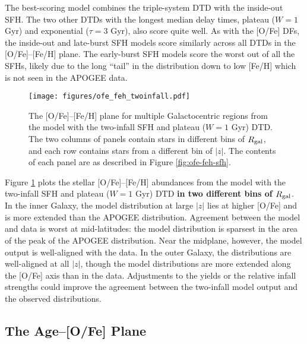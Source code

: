 \documentclass[twocolumn,twocolappendix,linenumbers]{aastex631}
\begin{document}
The best-scoring model combines the triple-system DTD with the inside-out SFH. The two other DTDs with the longest median delay times, plateau ($W=1$ Gyr) and exponential ($\tau=3$ Gyr), also score quite well. As with the [O/Fe] DFs, the inside-out and late-burst SFH models score similarly across all DTDs in the [O/Fe]--[Fe/H] plane. The early-burst SFH models score the worst out of all the SFHs, likely due to the long ``tail'' in the distribution down to low [Fe/H] which is not seen in the APOGEE data.

\begin{figure}
    \centering
    \texttt{[image: figures/ofe\_feh\_twoinfall.pdf]}
    \caption{The [O/Fe]--[Fe/H] plane for multiple Galactocentric regions from the model with the two-infall SFH and plateau ($W=1$ Gyr) DTD. The two columns of panels contain stars in different bins of $R_{\rm gal}$, and each row contains stars from a different bin of $|z|$. The contents of each panel are as described in Figure \ref{fig:ofe-feh-sfh}.}
    \label{fig:ofe-feh-twoinfall}
\end{figure}

Figure \ref{fig:ofe-feh-twoinfall} plots the stellar [O/Fe]--[Fe/H] abundances from the model with the two-infall SFH and plateau ($W=1$ Gyr) DTD {\bf in two different bins of $R_{\rm gal}$}. In the inner Galaxy, the model distribution at large $|z|$ lies at higher [O/Fe] and is more extended than the APOGEE distribution. Agreement between the model and data is worst at mid-latitudes: the model distribution is sparsest in the area of the peak of the APOGEE distribution. Near the midplane, however, the model output is well-aligned with the data. In the outer Galaxy, the distributions are well-aligned at all $|z|$, though the model distributions are more extended along the [O/Fe] axis than in the data. Adjustments to the yields or the relative infall strengths could improve the agreement between the two-infall model output and the observed distributions.

\subsection{The Age--[O/Fe] Plane}
\label{sec:age-ofe}
\end{document}
